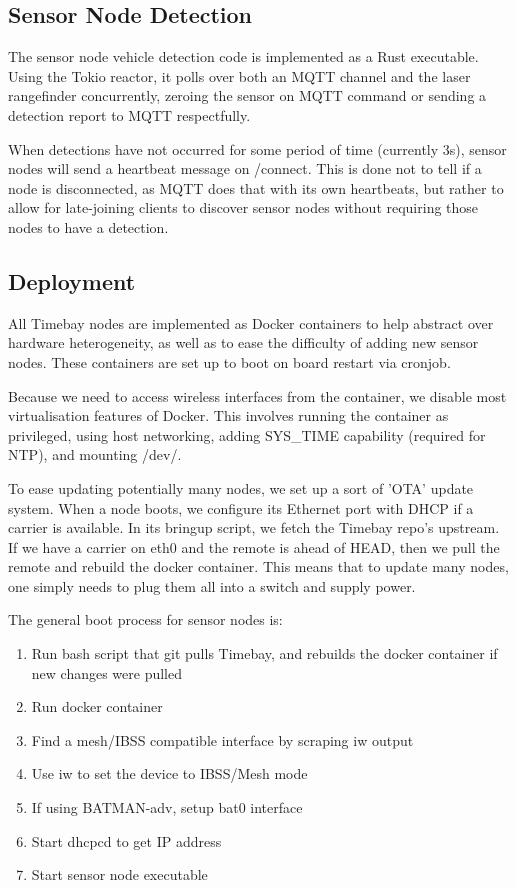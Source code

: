 \documentclass[journal]{IEEEtran}
\begin{document}
\subsection{Sensor Node Detection}

The sensor node vehicle detection code is implemented as a Rust executable. Using the Tokio reactor, it polls over both an MQTT channel and the laser rangefinder concurrently, zeroing the sensor on MQTT command or sending a detection report to MQTT respectfully.

When detections have not occurred for some period of time (currently 3s), sensor nodes will send a heartbeat message on /connect. This is done not to tell if a node is disconnected, as MQTT does that with its own heartbeats, but rather to allow for late-joining clients to discover sensor nodes without requiring those nodes to have a detection.

\subsection{Deployment}

All Timebay nodes are implemented as Docker containers to help abstract over hardware heterogeneity, as well as to ease the difficulty of adding new sensor nodes. These containers are set up to boot on board restart via cronjob.

Because we need to access wireless interfaces from the container, we disable most virtualisation features of Docker. This involves running the container as privileged, using host networking, adding SYS\_TIME capability (required for NTP), and mounting /dev/.

To ease updating potentially many nodes, we set up a sort of 'OTA' update system. When a node boots, we configure its Ethernet port with DHCP if a carrier is available. In its bringup script, we fetch the Timebay repo's upstream. If we have a carrier on eth0 and the remote is ahead of HEAD, then we pull the remote and rebuild the docker container. This means that to update many nodes, one simply needs to plug them all into a switch and supply power.

The general boot process for sensor nodes is:
\begin{enumerate}
    \item Run bash script that git pulls Timebay, and rebuilds the docker container if new changes were pulled
    \item Run docker container
    \item Find a mesh/IBSS compatible interface by scraping iw output
    \item Use iw to set the device to IBSS/Mesh mode
    \item If using BATMAN-adv, setup bat0 interface
    \item Start dhcpcd to get IP address
    \item Start sensor node executable
\end{enumerate}
\end{document}
